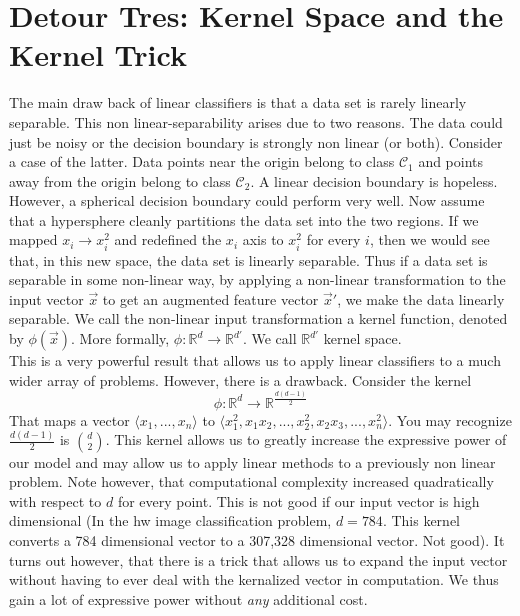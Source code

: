 \documentclass[10pt]{article}
\begin{document}
\section*{Detour Tres: Kernel Space and the Kernel Trick}
	The main draw back of linear classifiers is that a data set is rarely linearly separable. This non linear-separability arises
	due to two reasons. The data could just be noisy or the decision boundary is strongly non linear (or both). Consider a 
	case of the latter. Data points near the origin belong to class $\mathcal C_1$ and points away from the origin belong to 
	class $\mathcal C_2$. A linear decision boundary is hopeless. However, a spherical decision boundary could perform 
	very well. Now assume that a hypersphere cleanly partitions the data set into the two regions. If we mapped 
	$x_i \rightarrow x_i^2$ and redefined the $x_i$ axis to $x_i^2$ for every $i$, then we would see that, in this new space, 
	the data set is linearly separable. Thus if a data set is separable in some non-linear way, by applying a non-linear
	transformation to the input vector $\vec x$ to get an augmented feature vector $\vec x'$, we make the data linearly 
	separable. We call the non-linear input transformation a kernel function, denoted by $\phi(\vec x)$. More formally,
	$\phi : \mathbb{R}^d \rightarrow \mathbb{R}^{d'}$. We call $\mathbb{R}^{d'}$ kernel space.\\
	
	\noindent This is a very powerful result that allows us to apply linear classifiers to a much wider array of problems. 
	However, there is a drawback. Consider the kernel 
	$$\phi : \mathbb{R}^d \rightarrow \mathbb{R}^{\frac{d(d-1)}{2}}$$
	That maps a vector $\langle x_1, ..., x_n \rangle$ to $\langle x_1^2, x_1x_2, ..., x_2^2, x_2 x_3,...,x_n^2\rangle$. You 
	may recognize $\frac{d(d-1)}{2}$ is $\binom{d}{2}$. This kernel allows us to greatly increase the expressive power of
	our model and may allow us to apply linear methods to a previously non linear problem. Note however, that 
	computational complexity increased quadratically with respect to $d$ for every point. This is not good if our input 
	vector is high dimensional (In the hw image classification problem, $d = 784$. This kernel converts a 784 dimensional 
	vector to a 307,328 dimensional vector. Not good). It turns out however, that there is a trick that allows us
	to expand the input vector without having to ever deal with the kernalized vector in computation. We thus gain 
	a lot of expressive power without \textit{any} additional cost. \\
	
\end{document}
